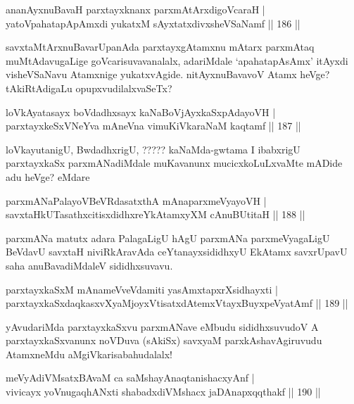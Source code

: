 \begin{shl}
ananAyxnuBavaH parxtayxknanx parxmAtArxdigoVcaraH | \\
yatoV\s pahatapApAmxdi yukatxM sAyxtatxdivxsheVSaNamf \hfill||  186 ||  
\end{shl}

\begin{artha}
savxtaMtArxnuBavarUpanAda parxtayxgAtamxnu mAtarx parxmAtaq muMtAdavugaLige goVcarisuvavanalalx, adariMdale `apahatapAsAmx' itAyxdi visheVSaNavu Atamxnige yukatxvAgide. nitAyxnuBavavoV Atamx heVge? tAkiRtAdigaLu opupxvudilalxvaSeTx? 
\end{artha}

\begin{shl}
loVkAyatasayx boVdadhxsayx kaNaBoVjAyxkaSxpAdayoVH | \\
parxtayxkeSxVNeYva mAneVna vimuKiVkaraNaM kaqtamf \hfill||  187 ||  
\end{shl}

\begin{artha}
loVkayutanigU, BwdadhxrigU, {????? kaNaMda}-gwtama I ibabxrigU parxtayxkaSx parxmANadiMdale muKavanunx mucicxkoLuLxvaMte mADide adu heVge? eMdare
\end{artha}

\begin{shl}
parxmANaPalayoVBeVRdasatxthA mAnaparxmeVyayoVH | \\
savxtaHkUTasathxcitisxdidhxreYkAtamxyXM cAnuBUtitaH \hfill||  188 ||  
\end{shl}

\begin{artha}
parxmANa matutx adara PalagaLigU hAgU parxmANa parxmeVyagaLigU BeVdavU savxtaH niviRkAravAda ceYtanayxsididhxyU EkAtamx savxrUpavU saha anuBavadiMdaleV sididhxsuvavu.
\end{artha}

\begin{shl}
parxtayxkaSxM mAnameVveVdamiti yasAmxtapxrXsidhayxti | \\
parxtayxkaSxdaqkasxvXyaMjoyxVtisatxdAtemxVtayxBuyxpeVyatAmf \hfill||  189 ||  
\end{shl}

\begin{artha}
yAvudariMda parxtayxkaSxvu parxmANave eMbudu sididhxsuvudoV A parxtayxkaSxvanunx noVDuva (sAkiSx) savxyaM parxkAshavAgiruvudu AtamxneMdu aMgiVkarisabahudalalx! 
\end{artha}

\begin{shl}
meVyAdiVMsatxBAvaM ca saMshayAnaqtanishacxyAnf | \\
vivicayx yoV\s nugaqhANxti shabadxdiVMshacx jaDAnapxqqthakf \hfill||  190 ||  
\end{shl}

